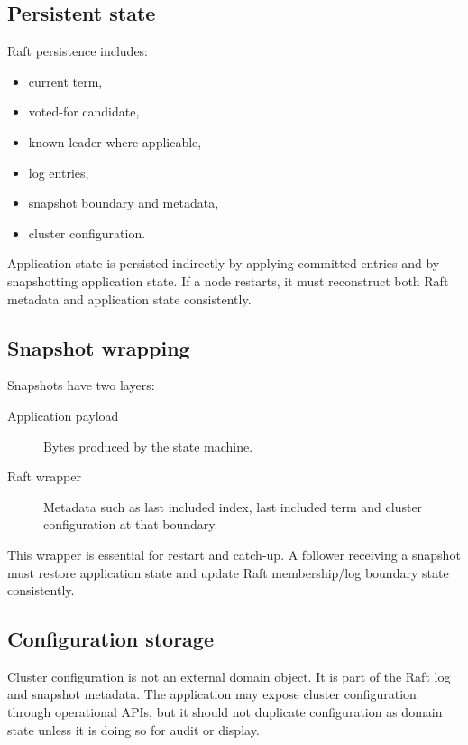 \subsection{Persistent state}

Raft persistence includes:

\begin{itemize}
\item current term,
\item voted-for candidate,
\item known leader where applicable,
\item log entries,
\item snapshot boundary and metadata,
\item cluster configuration.
\end{itemize}

Application state is persisted indirectly by applying committed entries and by
snapshotting application state. If a node restarts, it must reconstruct both Raft
metadata and application state consistently.

\subsection{Snapshot wrapping}

Snapshots have two layers:

\begin{description}
\item[Application payload] Bytes produced by the state machine.
\item[Raft wrapper] Metadata such as last included index, last included term and
cluster configuration at that boundary.
\end{description}

This wrapper is essential for restart and catch-up. A follower receiving a
snapshot must restore application state and update Raft membership/log boundary
state consistently.

\subsection{Configuration storage}

Cluster configuration is not an external domain object. It is part of the Raft
log and snapshot metadata. The application may expose cluster configuration
through operational APIs, but it should not duplicate configuration as domain
state unless it is doing so for audit or display.

